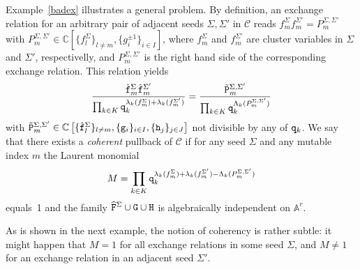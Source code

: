 \documentclass{amsart}
\theoremstyle{definition}
\theoremstyle{remark}
\numberwithin{equation}{section}
\numberwithin{theorem}{section}
\def\AA{{\mathbb A}}
\def\C{{\mathbb C}}
\def\CC{{\mathcal C}}
\def\ttf{{\tt f}}
\def\ttg{{\tt g}}
\def\tth{{\tt h}}
\def\ttq{{\tt q}}
\def\ttF{{\tt F}}
\def\ttG{{\tt G}}
\def\ttH{{\tt H}}
\begin{document}
Example~\ref{badex} illustrates a general problem. By definition, an exchange relation for an arbitrary pair of adjacent seeds $\Sigma, \Sigma'$ in $\CC$ reads
$f_m^\Sigma f_m^{\Sigma'}=P_m^{\Sigma,\Sigma'}$ with $P_m^{\Sigma,\Sigma'}\in \C[\{f_l^\Sigma\}_{l\ne m},\{g_i^{\pm1}\}_{i\in I}]$,  where $f_m^\Sigma$ and $f_m^{\Sigma'}$ are cluster variables in $\Sigma$ and $\Sigma'$, respectivelly, and $P_m^{\Sigma,\Sigma'}$ is the right hand side of the corresponding exchange relation. This relation yields  
\begin{equation}\label{liftedexch}
\frac{\hat \ttf_m^\Sigma\hat\ttf_m^{\Sigma'}}{\prod_{k\in K}\ttq_k^{\lambda_k(f_m^\Sigma)+\lambda_k(f_m^{\Sigma'})}}
=\frac{\tilde {\tt P}_m^{\Sigma,\Sigma'}}{\prod_{k\in K}\ttq_k^{\Lambda_k(P_m^{\Sigma,\Sigma'})}}
\end{equation}
with $\tilde{\tt P}_m^{\Sigma,\Sigma'}\in\C\left[\{\hat\ttf_l^\Sigma\}_{l\ne m},\{\ttg_i\}_{i\in I}, \{\tth_j\}_{j\in J} \right]$ not divisible by any of $\ttq_k$. 
We say that there exists a {\it coherent\/} pullback of $\CC$ if for any seed $\Sigma$ and any mutable index $m$ 
the Laurent monomial
\begin{equation}\label{M}
M=\prod_{k\in K}\ttq_k^{\lambda_k(f_m^\Sigma)+\lambda_k(f_m^{\Sigma'})-\Lambda_k(P_m^{\Sigma,\Sigma'})}
\end{equation}
equals~1 and the family $\widehat\ttF^\Sigma\cup\ttG\cup\ttH$ is algebraically independent on $\AA^r$.

 As is shown in the next example, the notion of coherency is rather subtle: it might happen that $M=1$ for all exchange relations in some seed $\Sigma$, and $M\ne 1$ for an exchange relation in an adjacent seed $\Sigma'$.
\end{document}
